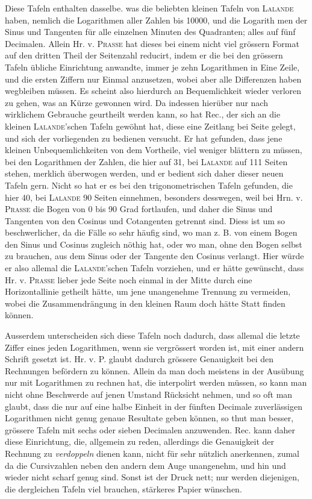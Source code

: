 Diese Tafeln enthalten dasselbe. was die beliebten kleinen Tafeln von \textsc{Lalande} haben, nemlich die Logarithmen aller Zahlen bis 10000, und die Logarith%
men der Sinus und Tangenten für alle einzelnen Minuten des Quadranten; alles
auf fünf Decimalen. Allein Hr. v. \textsc{Prasse} hat dieses bei einem nicht viel grössern
Format auf den dritten Theil der Seitenzahl reducirt, indem er die bei den grössern
Tafeln übliche Einrichtung anwandte, immer je zehn Logarithmen in Eine Zeile,
und die ersten Ziffern nur Einmal anzusetzen, wobei aber alle Differenzen haben
wegbleiben müssen. Es scheint also hierdurch an Bequemlichkeit wieder verloren zu gehen, was an Kürze gewonnen wird. Da indessen hierüber nur nach
wirklichem Gebrauche geurtheilt werden kann, so hat Rec., der sich an die kleinen \textsc{Lalande}'schen Tafeln gewöhnt hat, diese eine Zeitlang bei Seite gelegt, und
sich der vorliegenden zu bedienen versucht. Er hat gefunden, dass jene kleinen
Unbequemlichkeiten von dem Vortheile, viel weniger blättern zu müssen, bei den
Logarithmen der Zahlen, die hier auf 31, bei \textsc{Lalande} auf 111 Seiten stehen,
merklich überwogen werden, und er bedient sich daher dieser neuen Tafeln gern.
Nicht so hat er es bei den trigonometrischen Tafeln gefunden, die hier 40, bei
\textsc{Lalande} 90 Seiten einnehmen, besonders desswegen, weil bei Hrn. v. \textsc{Prasse} die
Bogen von 0 bis 90 Grad fortlaufen, und daher die Sinus und Tangenten von den
Cosinus und Cotangenten getrennt sind. Diess ist um so beschwerlicher, da die
Fälle so sehr häufig sind, wo man z. B. von einem Bogen den Sinus und Cosinus
zugleich nöthig hat, oder wo man, ohne den Bogen selbst zu brauchen, aus dem
Sinus oder der Tangente den Cosinus verlangt. Hier würde er also allemal die
\textsc{Lalande}'schen Tafeln vorziehen, und er hätte gewünscht, dass Hr. v. \textsc{Prasse} lieber jede Seite noch einmal in der Mitte durch eine Horizontallinie getheilt hätte,
um jene unangenehme Trennung zu vermeiden, wobei die Zusammendrängung in
den kleinen Raum doch hätte Statt finden können.

Ausserdem unterscheiden sich diese Tafeln noch dadurch, dass allemal die
letzte Ziffer eines jeden Logarithmen, wenn sie vergrössert worden ist, mit einer
andern Schrift gesetzt ist. Hr. v. P. glaubt dadurch grössere Genauigkeit bei den
Rechnungen befördern zu können. Allein da man doch meistens in der Ausübung
nur mit Logarithmen zu rechnen hat, die interpolirt werden müssen, so kann
man nicht ohne Beschwerde auf jenen Umstand Rücksicht nehmen, und so oft
man glaubt, dass die nur auf eine halbe Einheit in der fünften Decimale zuverlässigen Logarithmen nicht genug genaue Resultate geben können, so thut man
besser, grössere Tafeln mit sechs oder sieben Decimalen anzuwenden. Rec. kann
daher diese Einrichtung, die, allgemein zu reden, allerdings die Genauigkeit der
Rechnung zu \emph{verdoppeln} dienen kann, nicht für sehr nützlich anerkennen, zumal
da die Cursivzahlen neben den andern dem Auge unangenehm, und hin und wieder nicht scharf genug sind. Sonst ist der Druck nett; nur werden diejenigen,
die dergleichen Tafeln viel brauchen, stärkeres Papier wünschen.

